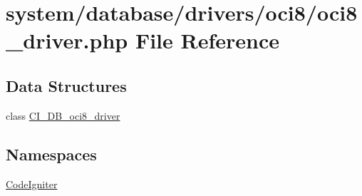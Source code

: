 \hypertarget{oci8__driver_8php}{\section{system/database/drivers/oci8/oci8\-\_\-driver.php File Reference}
\label{oci8__driver_8php}
}
\subsection*{Data Structures}
\begin{DoxyCompactItemize}
\item 
class \hyperlink{class_c_i___d_b__oci8__driver}{C\-I\-\_\-\-D\-B\-\_\-oci8\-\_\-driver}
\end{DoxyCompactItemize}
\subsection*{Namespaces}
\begin{DoxyCompactItemize}
\item 
\hyperlink{namespace_code_igniter}{Code\-Igniter}
\end{DoxyCompactItemize}
